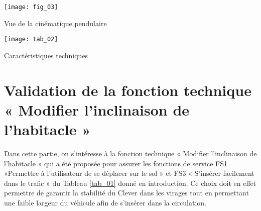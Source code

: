 \begin{marginfigure}
\texttt{[image: fig\_03]}

\caption{Vue de la cinématique pendulaire}
\label{fig_03}
\end{marginfigure}

\begin{marginfigure}
\texttt{[image: tab\_02]}

\caption{Caractéristiques techniques}
\label{tab_02}
\end{marginfigure}


%


%

\section*{Validation de la fonction technique « Modifier l'inclinaison de l'habitacle »}
\begin{obj}
Dans cette partie, on s'intéresse à la fonction technique « Modifier l'inclinaison de l'habitacle » qui a été proposée pour assurer les fonctions de service FS1 «Permettre à l'utilisateur de se déplacer sur le sol » et FS3 « S'insérer facilement dans le trafic » du Tableau \autoref{tab_01} donné en introduction. Ce choix doit en effet permettre de garantir la stabilité du Clever dans les virages tout en permettant une faible largeur du véhicule afin de s'insérer dans la circulation.
\end{obj}


